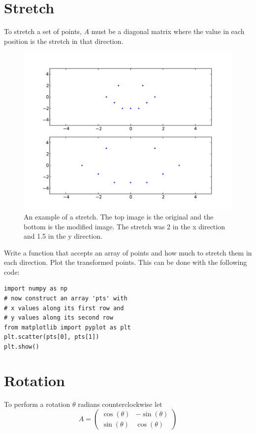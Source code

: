 \section*{Stretch}
To stretch a set of points, $A$ must be a diagonal matrix where the value in each position is the stretch in that direction.
\begin{figure}
\centering
\includegraphics[width=\textwidth]{stretch.pdf}
\caption{An example of a stretch. The top image is the original and the bottom is the modified image. The stretch was 2 in the x direction and 1.5 in the y direction.}
\end{figure}

\begin{problem}
Write a function that accepts an array of points and how much to stretch them in each direction.
Plot the transformed points.
This can be done with the following code:
\begin{lstlisting}
import numpy as np
# now construct an array 'pts' with
# x values along its first row and
# y values along its second row
from matplotlib import pyplot as plt
plt.scatter(pts[0], pts[1])
plt.show()
\end{lstlisting}
\end{problem}

\section*{Rotation}

To perform a rotation $\theta$ radians counterclockwise let
\[
A = \begin{pmatrix}
\cos(\theta) & -\sin(\theta) \\
\sin(\theta) & \cos(\theta) 
\end{pmatrix}
\]

